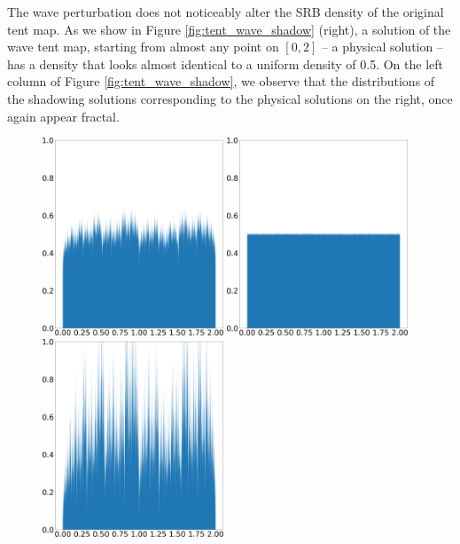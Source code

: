 The wave perturbation does not noticeably alter the SRB density of the original tent map. As we show in Figure \ref{fig:tent_wave_shadow} (right), a solution of the 
wave tent map, starting from almost any point on $[0,2]$ -- a physical solution -- has a density that looks almost identical to a uniform density of 0.5. On the left column of Figure \ref{fig:tent_wave_shadow}, we observe that the distributions of the shadowing solutions corresponding to the physical solutions on the right, once again appear fractal.  
\begin{figure}
    \centering
    \includegraphics[width=0.48\textwidth]{figure/tent_wave_shadow_density_0.05.png}
    \hspace{0.02\textwidth}
    \includegraphics[width=0.48\textwidth]{figure/tent_wave_physical_density_0.05.png}
    \\ \vspace{0.02\textwidth}
    \includegraphics[width=0.48\textwidth]{figure/tent_wave_shadow_density_0.2.png}

\end{figure}
